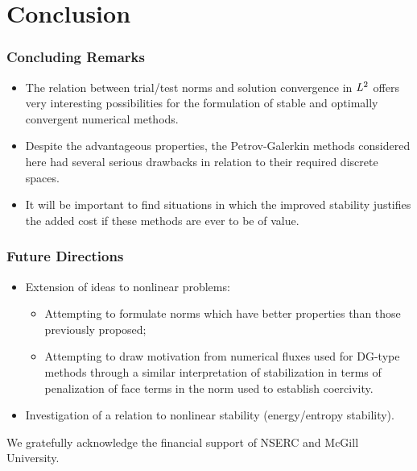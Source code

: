 \section{Conclusion}

\begin{frame}
\frametitle{Concluding Remarks}

\begin{itemize}
  \item The relation between trial/test norms and solution convergence in
    $\mathit{{{L}}}^2$ offers very interesting possibilities for the formulation of
    stable and optimally convergent numerical methods.
  \item Despite the advantageous properties, the Petrov-Galerkin methods considered
    here had several serious drawbacks in relation to their required discrete spaces.
  \item It will be important to find situations in which the improved stability
   justifies the added cost if these methods are ever to be of value.
\end{itemize}

\end{frame}

\begin{frame}
\frametitle{Future Directions}

\begin{itemize}
  \item Extension of ideas to nonlinear problems:
\begin{itemize}
  \item Attempting to formulate norms which
    have better properties than those previously proposed;
  \item Attempting to draw motivation from numerical fluxes used for DG-type
    methods through a similar interpretation of stabilization in terms of
    penalization of face terms in the norm used to establish coercivity.
\end{itemize}
  \item Investigation of a relation to nonlinear stability (energy/entropy stability).
\end{itemize}

\vspace{1cm}

We gratefully acknowledge the financial support of NSERC and McGill University.

\end{frame}